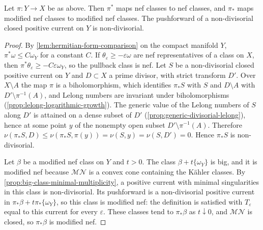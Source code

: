\begin{proposition}\label{prop:positivity-under-modifications}
Let $\pi\colon Y\to X$ be as above. Then $\pi^*$ maps nef classes to nef classes, and $\pi_*$ maps modified nef classes to modified nef classes. The pushforward of a non-divisorial closed positive current on $Y$ is non-divisorial.
\end{proposition}
\begin{proof}
By \cref{lem:hermitian-form-comparison} on the compact manifold $Y$, $\pi^*\omega\leq C\omega_Y$ for a constant $C$. If $\theta_\varepsilon\geq-\varepsilon\omega$ are nef representatives of a class on $X$, then $\pi^*\theta_\varepsilon\geq-C\varepsilon\omega_Y$, so the pullback class is nef. Let $S$ be a non-divisorial closed positive current on $Y$ and $D\subset X$ a prime divisor, with strict transform $D'$. Over $X\setminus A$ the map $\pi$ is a biholomorphism, which identifies $\pi_*S$ with $S$ and $D\setminus A$ with $D'\setminus\pi^{-1}(A)$, and Lelong numbers are invariant under biholomorphisms (\cref{prop:lelong-logarithmic-growth}). The generic value of the Lelong numbers of $S$ along $D'$ is attained on a dense subset of $D'$ (\cref{prop:generic-divisorial-lelong}), hence at some point $y$ of the nonempty open subset $D'\setminus\pi^{-1}(A)$. Therefore $\nu(\pi_*S,D)\leq\nu(\pi_*S,\pi(y))=\nu(S,y)=\nu(S,D')=0$. Hence $\pi_*S$ is non-divisorial.

Let $\beta$ be a modified nef class on $Y$ and $t>0$. The class $\beta+t\{\omega_Y\}$ is big, and it is modified nef because $\mathcal{MN}$ is a convex cone containing the K\"ahler classes. By \cref{prop:big-class-minimal-multiplicity}, a positive current with minimal singularities in this class is non-divisorial. Its pushforward is a non-divisorial positive current in $\pi_*\beta+t\pi_*\{\omega_Y\}$, so this class is modified nef: the definition is satisfied with $T_\varepsilon$ equal to this current for every $\varepsilon$. These classes tend to $\pi_*\beta$ as $t\downarrow0$, and $\mathcal{MN}$ is closed, so $\pi_*\beta$ is modified nef.
\end{proof}


